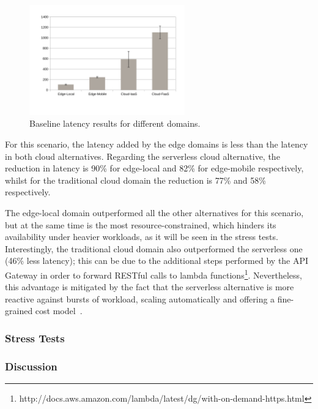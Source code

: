 \begin{figure}
	
	\centering
	\includegraphics[width=0.6\textwidth]{figs/latency-baseline}
	\caption{Baseline latency results for different domains.}
	\label{fig:baseline-latency}
\end{figure}

 For this scenario, the latency added by the edge domains is less than the latency in both cloud alternatives. Regarding the serverless cloud alternative, the reduction in latency is 90\% for edge-local and 82\% for edge-mobile respectively, whilst for the traditional cloud domain the reduction is 77\% and 58\% respectively. 
 
 The edge-local domain outperformed all the other alternatives for this scenario, but at the same time is the most resource-constrained, which hinders its availability under heavier workloads, as it will be seen in the stress tests. Interestingly, the traditional cloud domain also outperformed the serverless one (46\% less latency); this can be due to the additional steps performed by the API Gateway in order to forward RESTful calls to lambda functions\footnote{http://docs.aws.amazon.com/lambda/latest/dg/with-on-demand-https.html}. Nevertheless, this advantage is mitigated by the fact that the serverless alternative is more reactive against bursts of workload, scaling automatically and offering a fine-grained cost model~\cite{Villamizar2017lambda,Hendrickson:2016}.

\subsubsection{Stress Tests}

\subsubsection{Discussion}



